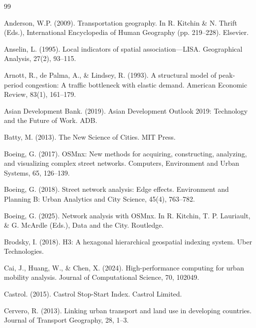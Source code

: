 \documentclass[12pt,a4paper]{article}
\begin{document}
\begin{thebibliography}{99}

\item Anderson, W.P. (2009). Transportation geography. In R. Kitchin \& N. Thrift (Eds.), International Encyclopedia of Human Geography (pp. 219--228). Elsevier.

\item Anselin, L. (1995). Local indicators of spatial association---LISA. Geographical Analysis, 27(2), 93--115.

\item Arnott, R., de Palma, A., \& Lindsey, R. (1993). A structural model of peak-period congestion: A traffic bottleneck with elastic demand. American Economic Review, 83(1), 161--179.

\item Asian Development Bank. (2019). Asian Development Outlook 2019: Technology and the Future of Work. ADB.

\item Batty, M. (2013). The New Science of Cities. MIT Press.

\item Boeing, G. (2017). OSMnx: New methods for acquiring, constructing, analyzing, and visualizing complex street networks. Computers, Environment and Urban Systems, 65, 126--139.

\item Boeing, G. (2018). Street network analysis: Edge effects. Environment and Planning B: Urban Analytics and City Science, 45(4), 763--782.

\item Boeing, G. (2025). Network analysis with OSMnx. In R. Kitchin, T. P. Lauriault, \& G. McArdle (Eds.), Data and the City. Routledge.

\item Brodsky, I. (2018). H3: A hexagonal hierarchical geospatial indexing system. Uber Technologies.

\item Cai, J., Huang, W., \& Chen, X. (2024). High-performance computing for urban mobility analysis. Journal of Computational Science, 70, 102049.

\item Castrol. (2015). Castrol Stop-Start Index. Castrol Limited.

\item Cervero, R. (2013). Linking urban transport and land use in developing countries. Journal of Transport Geography, 28, 1--3.


\end{thebibliography}
\end{document}
